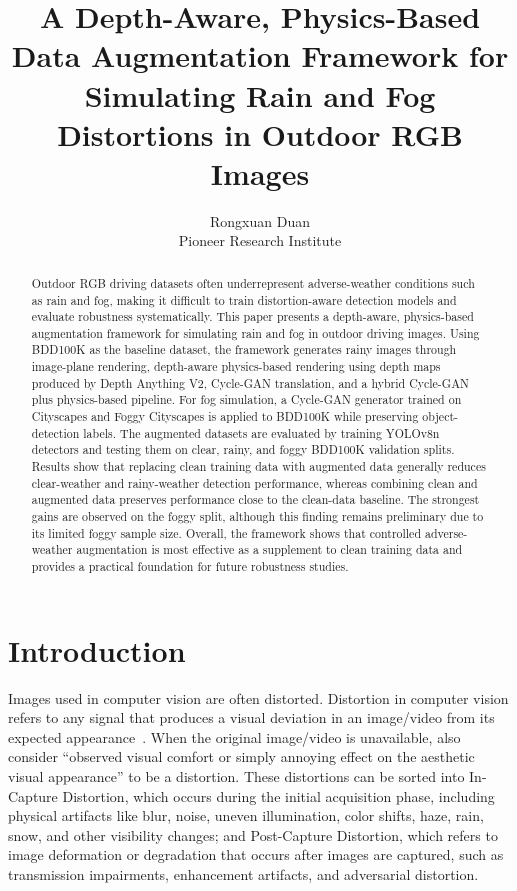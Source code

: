\documentclass[10pt,letterpaper]{article}
\title{A Depth-Aware, Physics-Based Data Augmentation Framework for Simulating Rain and Fog
Distortions in Outdoor RGB Images}
\author{
Rongxuan Duan\\
Pioneer Research Institute\\
{\tt\small }
}
\date{}
\begin{document}
\maketitle

\begin{abstract}
Outdoor RGB driving datasets often underrepresent adverse-weather conditions such as rain and fog, making it difficult to train distortion-aware detection models and evaluate 
robustness systematically. This paper presents a depth-aware, physics-based augmentation framework for simulating rain and fog in outdoor driving images. 
Using BDD100K as the baseline dataset, the framework generates rainy images through image-plane rendering, depth-aware physics-based rendering using depth maps produced by Depth Anything V2, 
Cycle-GAN translation, and a hybrid Cycle-GAN plus physics-based pipeline. For fog simulation, a Cycle-GAN generator trained on Cityscapes and Foggy 
Cityscapes is applied to BDD100K while preserving object-detection labels. The augmented datasets are evaluated by training YOLOv8n detectors 
and testing them on clear, rainy, and foggy BDD100K validation splits. Results show that replacing clean training data with augmented data generally reduces 
clear-weather and rainy-weather detection performance, whereas combining clean and augmented data preserves performance close to the clean-data baseline. 
The strongest gains are observed on the foggy split, although this finding remains preliminary due to its limited foggy sample size. 
Overall, the framework shows that controlled adverse-weather augmentation is most effective as a supplement to clean training data and provides a practical 
foundation for future robustness studies.
\end{abstract}

\vspace{1em}

\section{Introduction}
Images used in computer vision are often distorted. Distortion in computer vision refers to any signal that produces a visual deviation in an image/video 
from its expected appearance~\cite{muhammadaliqureshiDistortionClassificationComputer}. When the original image/video is unavailable, \textcite{muhammadaliqureshiDistortionClassificationComputer} also consider ``observed visual comfort or simply annoying effect
on the aesthetic visual appearance'' to be a distortion. These distortions can be
sorted into In-Capture Distortion, which occurs during the initial acquisition phase, including physical artifacts like blur, noise, uneven illumination, color shifts, haze,
rain, snow, and other visibility changes; and Post-Capture Distortion, which refers to image deformation or degradation that occurs after images are captured, such as transmission
impairments, enhancement artifacts, and adversarial distortion. 
\end{document}
